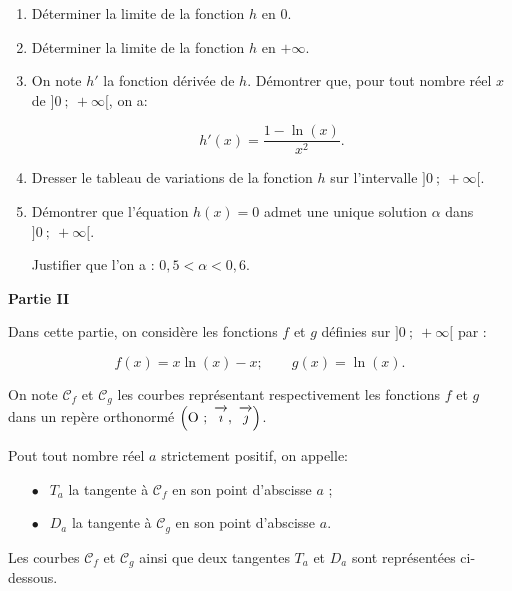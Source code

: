 \documentclass[11pt]{article}
\newcommand{\vect}[1]{\overrightarrow{\,\mathstrut#1\,}}
\def\Oij{$\left(\text{O}~;~\vect{\imath},~\vect{\jmath}\right)$}
\begin{document}
\smallskip

\begin{enumerate}
\item Déterminer la limite de la fonction $h$ en $0$.
\item Déterminer la limite de la fonction $h$ en $+\infty$.
\item On note $h'$ la fonction dérivée de $h$. Démontrer que, pour tout nombre réel $x$ de $]0~;~ +\infty[$, on a:

\[h'(x) = \dfrac{1 - \ln (x)}{x^2}.\]

\smallskip

\item Dresser le tableau de variations de la fonction $h$ sur l'intervalle $]0~;~ +\infty[$.
\item Démontrer que l'équation $h(x) = 0$ admet une unique solution $\alpha$ dans $]0~;~ +\infty[$. 

Justifier que l'on a : $0,5 < \alpha < 0,6$.
\end{enumerate}

\bigskip

\textbf{Partie II}

\medskip

Dans cette partie, on considère les fonctions $f$ et $g$ définies sur $]0~;~ +\infty[$ par : 

\[f(x) = x \ln (x) - x ;\qquad  g(x) = \ln (x).\]

On note $\mathcal{C}_f$ et $\mathcal{C}_g$ les courbes représentant respectivement les fonctions $f$ et $g$ dans un repère orthonormé \Oij.

Pout tout nombre réel $a$ strictement positif, on appelle:

\setlength\parindent{1cm}
\begin{itemize}
\item[$\bullet~~$] $T_a$ la tangente à $\mathcal{C}_f$ en son point d'abscisse $a$ ;
\item[$\bullet~~$] $D_a$ la tangente à $\mathcal{C}_g$ en son point d'abscisse $a$.
\end{itemize}
\setlength\parindent{0cm}

Les courbes  $\mathcal{C}_f$ et $\mathcal{C}_g$ ainsi que deux tangentes $T_a$ et $D_a$ sont représentées ci-dessous.
\end{document}
